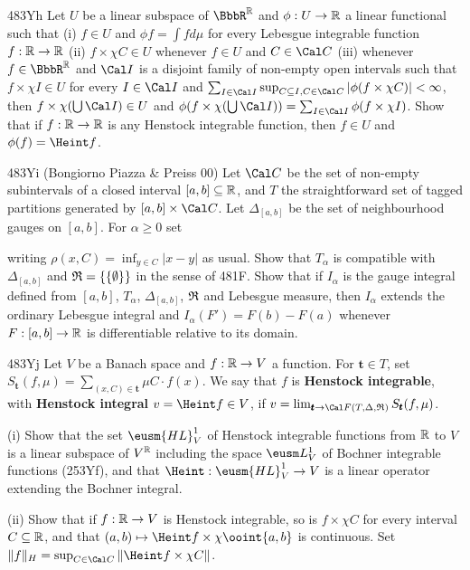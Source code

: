 {\spheader 483Yh Let $U$ be a linear subspace of $\BbbR^{\Bbb R}$ and
$\phi:U\to\Bbb R$ a linear functional such that (i) $f\in U$ and
$\phi f=\int fd\mu$ for every Lebesgue integrable function
$f:\Bbb R\to\Bbb R$ (ii) $f\times\chi C\in U$ whenever $f\in U$ and
$C\in\Cal C$ (iii) whenever $f\in\BbbR^{\Bbb R}$
and $\Cal I$ is a disjoint family
of non-empty open intervals such that $f\times\chi I\in U$ for every
$I\in\Cal I$ and
$\sum_{I\in\Cal I}\sup_{C\subseteq I,C\in\Cal C}
  |\phi(f\times\chi C)|<\infty$, then $f\times\chi(\bigcup\Cal I)\in U$
and
$\phi(f\times\chi(\bigcup\Cal I))=\sum_{I\in\Cal I}\phi(f\times\chi I)$.
Show that if $f:\Bbb R\to\Bbb R$ is any Henstock integrable function,
then $f\in U$ and $\phi(f)=\Heint f$.    

\spheader 483Yi ({\smc Bongiorno Piazza \& Preiss 00}) Let $\Cal C$ be the set of non-empty subintervals of a closed interval
$[a,b]\subseteq\Bbb R$, and $T$ the straightforward set of tagged
partitions generated by $[a,b]\times\Cal C$.   Let $\Delta_{[a,b]}$
be the set of neighbourhood gauges on $[a,b]$.   For $\alpha\ge 0$ set


\noindent writing $\rho(x,C)=\inf_{y\in C}|x-y|$ as usual.   Show that
$T_{\alpha}$ is compatible with $\Delta_{[a,b]}$ and
$\frak R=\{\{\emptyset\}\}$
in the sense of 481F.   Show that if $I_{\alpha}$ is the gauge integral
defined from $[a,b]$, $T_{\alpha}$, $\Delta_{[a,b]}$, $\frak R$ and
Lebesgue
measure, then $I_{\alpha}$ extends the ordinary Lebesgue integral and
$I_{\alpha}(F')=F(b)-F(a)$ whenever $F:[a,b]\to\Bbb R$ is
differentiable relative to its domain.

\spheader 483Yj Let $V$ be a Banach space and $f:\Bbb R\to V$ a
function.   For $\pmb{t}\in T$, set
$S_{\pmb{t}}(f,\mu)=\sum_{(x,C)\in\pmb{t}}\mu C\cdot f(x)$.
We say that $f$ is {\bf Henstock integrable}, with {\bf Henstock integral}
$v=\Heint f\in V$, if
$v=\lim_{\pmb{t}\to\Cal F(T,\Delta,\frak R)}S_{\pmb{t}}(f,\mu)$.

\quad(i) Show that the set $\eusm{HL}^1_V$ of Henstock integrable
functions from $\Bbb R$ to $V$ is a linear subspace of $V^{\Bbb R}$
including the space $\eusm L^1_V$ of Bochner integrable functions
(253Yf), and that $\Heint:\eusm{HL}^1_V\to V$ is a linear operator
extending the Bochner integral.

\quad(ii) Show that if $f:\Bbb R\to V$ is Henstock integrable, so is
$f\times\chi C$ for every interval $C\subseteq\Bbb R$, and that
$(a,b)\mapsto\Heint f\times\chi\ooint{a,b}$ is continuous.   Set
$\|f\|_H=\sup_{C\in\Cal C}\|\Heint f\times\chi C\|$.

}
